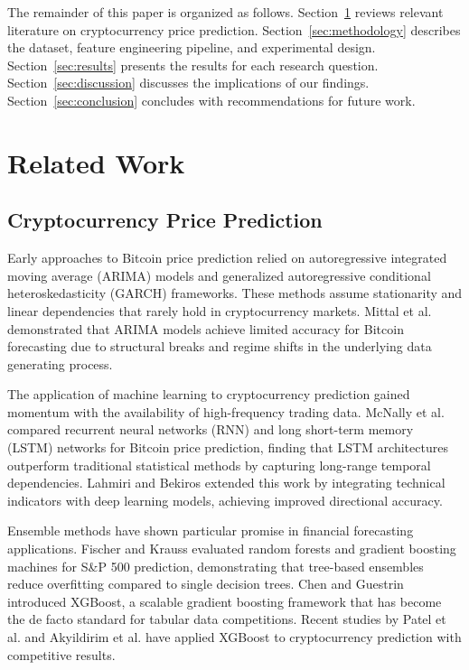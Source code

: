 \documentclass[conference]{IEEEtran}
\begin{document}
The remainder of this paper is organized as follows.
Section~\ref{sec:related_work} reviews relevant literature on cryptocurrency price prediction.
Section~\ref{sec:methodology} describes the dataset, feature engineering pipeline, and experimental design.
Section~\ref{sec:results} presents the results for each research question.
Section~\ref{sec:discussion} discusses the implications of our findings.
Section~\ref{sec:conclusion} concludes with recommendations for future work.

\section{Related Work}
\label{sec:related_work}

\subsection{Cryptocurrency Price Prediction}

Early approaches to Bitcoin price prediction relied on autoregressive integrated moving average (ARIMA) models and generalized autoregressive conditional heteroskedasticity (GARCH) frameworks.
These methods assume stationarity and linear dependencies that rarely hold in cryptocurrency markets.
Mittal et al. demonstrated that ARIMA models achieve limited accuracy for Bitcoin forecasting due to structural breaks and regime shifts in the underlying data generating process.

The application of machine learning to cryptocurrency prediction gained momentum with the availability of high-frequency trading data.
McNally et al. compared recurrent neural networks (RNN) and long short-term memory (LSTM) networks for Bitcoin price prediction, finding that LSTM architectures outperform traditional statistical methods by capturing long-range temporal dependencies.
Lahmiri and Bekiros extended this work by integrating technical indicators with deep learning models, achieving improved directional accuracy.

Ensemble methods have shown particular promise in financial forecasting applications.
Fischer and Krauss evaluated random forests and gradient boosting machines for S\&P 500 prediction, demonstrating that tree-based ensembles reduce overfitting compared to single decision trees.
Chen and Guestrin introduced XGBoost, a scalable gradient boosting framework that has become the de facto standard for tabular data competitions.
Recent studies by Patel et al. and Akyildirim et al. have applied XGBoost to cryptocurrency prediction with competitive results.
\end{document}
